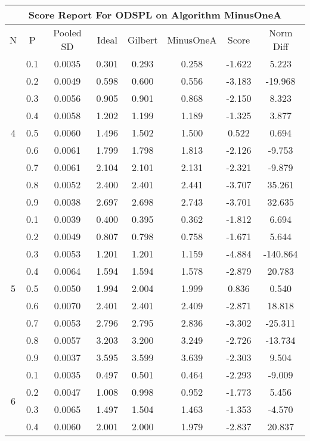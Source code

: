 \documentclass[11pt,a4paper]{report}
\begin{document}
\begin{longtable}{ | c | c || c | c | c | c | c | c | }
\hline
\multicolumn{8}{|c|}{ Score Report For ODSPL on Algorithm MinusOneA} \\
\hline
N & P & Pooled SD &  Ideal &  Gilbert & MinusOneA  & Score & Norm Diff \\
 \hline
 \hline
 \endhead
\multirow{9}{*}{4} & 0.1 & 0.0035 & 0.301 & 0.293 & 0.258 & -1.622 & 5.223 \\
 & 0.2 & 0.0049 & 0.598 & 0.600 & 0.556 & -3.183 & -19.968 \\
 & 0.3 & 0.0056 & 0.905 & 0.901 & 0.868 & -2.150 & 8.323 \\
 & 0.4 & 0.0058 & 1.202 & 1.199 & 1.189 & -1.325 & 3.877 \\
 & 0.5 & 0.0060 & 1.496 & 1.502 & 1.500 & 0.522 & 0.694 \\
 & 0.6 & 0.0061 & 1.799 & 1.798 & 1.813 & -2.126 & -9.753 \\
 & 0.7 & 0.0061 & 2.104 & 2.101 & 2.131 & -2.321 & -9.879 \\
 & 0.8 & 0.0052 & 2.400 & 2.401 & 2.441 & -3.707 & 35.261 \\
 & 0.9 & 0.0038 & 2.697 & 2.698 & 2.743 & -3.701 & 32.635 \\
 \hline
\multirow{9}{*}{5} & 0.1 & 0.0039 & 0.400 & 0.395 & 0.362 & -1.812 & 6.694 \\
 & 0.2 & 0.0049 & 0.807 & 0.798 & 0.758 & -1.671 & 5.644 \\
 & 0.3 & 0.0053 & 1.201 & 1.201 & 1.159 & -4.884 & -140.864 \\
 & 0.4 & 0.0064 & 1.594 & 1.594 & 1.578 & -2.879 & 20.783 \\
 & 0.5 & 0.0050 & 1.994 & 2.004 & 1.999 & 0.836 & 0.540 \\
 & 0.6 & 0.0070 & 2.401 & 2.401 & 2.409 & -2.871 & 18.818 \\
 & 0.7 & 0.0053 & 2.796 & 2.795 & 2.836 & -3.302 & -25.311 \\
 & 0.8 & 0.0057 & 3.203 & 3.200 & 3.249 & -2.726 & -13.734 \\
 & 0.9 & 0.0037 & 3.595 & 3.599 & 3.639 & -2.303 & 9.504 \\
 \hline
\multirow{9}{*}{6} & 0.1 & 0.0035 & 0.497 & 0.501 & 0.464 & -2.293 & -9.009 \\
 & 0.2 & 0.0047 & 1.008 & 0.998 & 0.952 & -1.773 & 5.456 \\
 & 0.3 & 0.0065 & 1.497 & 1.504 & 1.463 & -1.353 & -4.570 \\
 & 0.4 & 0.0060 & 2.001 & 2.000 & 1.979 & -2.837 & 20.837 \\

\end{longtable}
\end{document}
